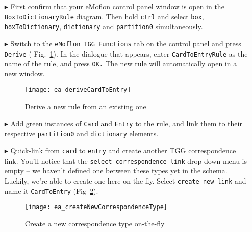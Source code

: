 \begin{enumerate}
  
\item[$\blacktriangleright$] First confirm that your eMoflon control panel window is open in the \texttt{Box\-To\-Dictionary\-Rule} diagram. Then hold
\texttt{ctrl} and select \texttt{box}, \texttt{box\-To\-Dictionary}, \texttt{dictionary} and \texttt{partition0} simultaneously.
  
\item[$\blacktriangleright$] Switch to the \texttt{eMoflon TGG Functions} tab on the control panel and press \texttt{Derive} (
Fig.~\ref{ea:derive_from_tgg_rule}). In the dialogue that appears, enter \texttt{Card\-To\-Ent\-ry\-Rule} as the name of the rule, and press \texttt{OK.} The
new rule will automatically open in a new window.

\begin{figure}[htbp]
\begin{center}
 \texttt{[image: ea\_deriveCardToEntry]}
  \caption{Derive a new rule from an existing one}
  \label{ea:derive_from_tgg_rule}
\end{center}
\end{figure}
\FloatBarrier

\item[$\blacktriangleright$] Add green instances of \texttt{Card} and \texttt{Entry} to the rule, and link them to their respective \texttt{partition0} and
\texttt{dictionary} elements. 

\vspace{0.5cm}

\item[$\blacktriangleright$] Quick-link from \texttt{card} to \texttt{entry} and create another TGG correspondence link. You'll notice that the
\texttt{select correspondence link} drop-down menu is empty -- we haven't defined one between these types yet in the schema. Luckily, we're able to create one
here on-the-fly. Select \texttt{create new link} and name it \texttt{CardToEntry} (Fig~\ref{ea:newCorrespondenceDialogue}). 

\vspace{0.5cm}

\begin{figure}[htbp]
\begin{center}
 \texttt{[image: ea\_createNewCorrespondenceType]}
  \caption{Create a new correspondence type on-the-fly}
  \label{ea:newCorrespondenceDialogue}
\end{center}
\end{figure}


\end{enumerate}
